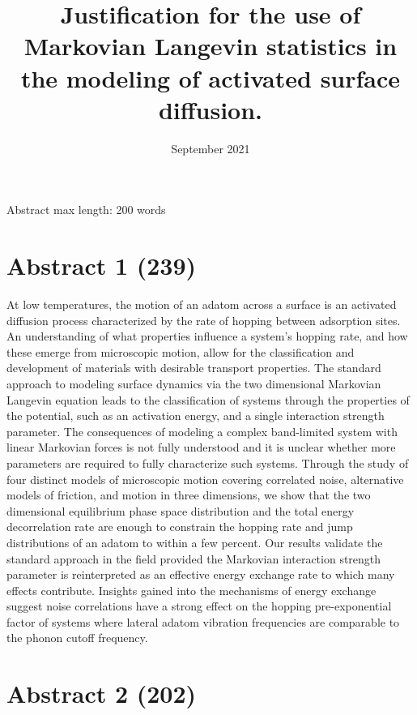 \documentclass[7pt]{article}
\title{Justification for the use of Markovian Langevin statistics in the modeling of activated surface diffusion.}
\date{September 2021}
\begin{document}
\maketitle

Abstract max length: 200 words

\section*{Abstract 1 (239)}

At low temperatures, the motion of an adatom across a surface is an activated diffusion process characterized by the rate of hopping between adsorption sites. An understanding of what properties influence a system's hopping rate, and how these emerge from microscopic motion, allow for the classification and development of materials with desirable transport properties. The standard approach to modeling surface dynamics via the two dimensional Markovian Langevin equation leads to the classification of systems through the properties of the potential, such as an activation energy, and a single interaction strength parameter. The consequences of modeling a complex band-limited system with linear Markovian forces is not fully understood and it is unclear whether more parameters are required to fully characterize such systems. Through the study of four distinct models of microscopic motion covering correlated noise, alternative models of friction, and motion in three dimensions, we show that the two dimensional equilibrium phase space distribution and the total energy decorrelation rate are enough to constrain the hopping rate and jump distributions of an adatom to within a few percent. Our results validate the standard approach in the field provided the Markovian interaction strength parameter is reinterpreted as an effective energy exchange rate to which many effects contribute. Insights gained into the mechanisms of energy exchange suggest noise correlations have a strong effect on the hopping pre-exponential factor of systems where lateral adatom vibration frequencies are comparable to the phonon cutoff frequency.  

\section*{Abstract 2 (202)}
\end{document}
